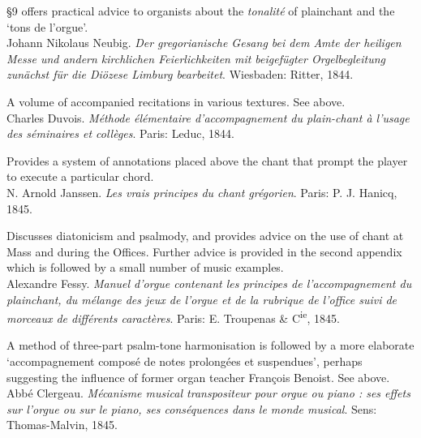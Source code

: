      \parindent=20pt
     \hangindent=20pt
     \S{}9 offers practical advice to organists about the \emph{tonalité} of plainchant and the `tons de l'orgue'.\\

    \parindent=0pt
    \hangindent=0pt
  Johann Nikolaus Neubig. \emph{Der gregorianische Gesang bei dem Amte der heiligen Messe und andern kirchlichen Feierlichkeiten mit beigefügter Orgelbegleitung zunächst für die Diözese Limburg bearbeitet}. Wiesbaden:  Ritter, 1844.

     \parindent=20pt
     \hangindent=20pt
     A volume of accompanied recitations in various textures. See  above.\\

    \parindent=0pt
    \hangindent=0pt
  Charles Duvois. \emph{Méthode élémentaire d'accompagnement du plain-chant à l'usage des séminaires et collèges}. Paris:  Leduc, 1844.

     \parindent=20pt
     \hangindent=20pt
     Provides a system of annotations placed above the chant that prompt the player to execute a particular chord.\\

    \parindent=0pt
    \hangindent=0pt
  N. Arnold Janssen. \emph{Les vrais principes du chant grégorien}. Paris:  P. J. Hanicq, 1845.

     \parindent=20pt
     \hangindent=20pt
     Discusses diatonicism and psalmody, and provides advice on the use of chant at Mass and during the Offices. Further advice is provided in the second appendix which is followed by a small number of music examples.\\

    \parindent=0pt
    \hangindent=0pt
  Alexandre Fessy. \emph{Manuel d'orgue contenant les principes de l'accompagnement du plainchant, du mélange des jeux de l'orgue et de la rubrique de l'office suivi de morceaux de différents caractères}. Paris:  E. Troupenas \& C\textsuperscript{ie}, 1845.

     \parindent=20pt
     \hangindent=20pt
     A method of three-part psalm-tone harmonisation is followed by a more elaborate `accompagnement composé de notes prolongées et suspendues', perhaps suggesting the influence of former organ teacher François Benoist. See  above.\\

    \parindent=0pt
    \hangindent=0pt
  Abbé Clergeau. \emph{Mécanisme musical transpositeur pour orgue ou piano : ses effets sur l'orgue ou sur le piano, ses conséquences dans le monde musical}. Sens:  Thomas-Malvin, 1845.


